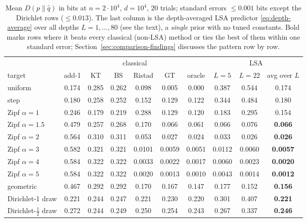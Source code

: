 \documentclass[11pt]{article}
\newcommand{\KL}{D}
\begin{document}
\begin{table}[t]
  \centering
  \small
  \setlength{\tabcolsep}{4.5pt}
  \begin{tabular}{lcccccc|ccc}
    \toprule
    & \multicolumn{6}{c|}{classical} & \multicolumn{3}{c}{LSA}\\
    target & add-1 & KT & BS & Ristad & GT & oracle & \(L{=}5\) & \(L{=}22\) & avg over \(L\)\\
    \midrule
    uniform            & 0.174 & 0.285 & 0.262 & 0.098 & 0.005 & 0.000 & 0.387 & 0.544 & 0.174\\
    step               & 0.180 & 0.258 & 0.252 & 0.152 & 0.129 & 0.122 & 0.344 & 0.484 & 0.180\\
    Zipf \(\alpha=1\)  & 0.246 & 0.179 & 0.219 & 0.288 & 0.129 & 0.120 & 0.183 & 0.295 & 0.154\\
    Zipf \(\alpha=1.5\)& 0.479 & 0.257 & 0.268 & 0.170 & 0.066 & 0.061 & 0.066 & 0.076 & \textbf{0.066}\\
    Zipf \(\alpha=2\)  & 0.564 & 0.310 & 0.311 & 0.053 & 0.027 & 0.024 & 0.033 & 0.026 & \textbf{0.026}\\
    Zipf \(\alpha=3\)  & 0.582 & 0.321 & 0.321 & 0.0101 & 0.0059 & 0.0051 & 0.0112 & 0.0060 & \textbf{0.0057}\\
    Zipf \(\alpha=4\)  & 0.584 & 0.322 & 0.322 & 0.0033 & 0.0022 & 0.0017 & 0.0060 & 0.0023 & \textbf{0.0020}\\
    Zipf \(\alpha=5\)  & 0.584 & 0.322 & 0.322 & 0.0020 & 0.0013 & 0.0010 & 0.0043 & 0.0014 & \textbf{0.0012}\\
    geometric          & 0.467 & 0.292 & 0.292 & 0.170 & 0.167 & 0.147 & 0.177 & 0.152 & \textbf{0.156}\\
    Dirichlet-1 draw   & 0.221 & 0.244 & 0.247 & 0.221 & 0.230 & 0.220 & 0.301 & 0.407 & \textbf{0.221}\\
    Dirichlet-\(\tfrac12\) draw & 0.272 & 0.244 & 0.249 & 0.250 & 0.254 & 0.243 & 0.267 & 0.337 & \textbf{0.246}\\
    \bottomrule
  \end{tabular}
  \caption{Mean \(\KL(p\|\hat q)\) in bits at \(n=2\cdot10^4\), \(d=10^4\),
  \(20\) trials; standard errors \(\le0.001\) bits except the Dirichlet
  rows (\(\le0.013\)).  The last column is the depth-averaged LSA predictor
  \eqref{eq:depth-average} over all depths \(L=1,\dots,80\) (see the text), a \emph{single} prior
  with no tuned constants.
Bold marks rows where it beats every classical (non-LSA) method or ties
the best of them within one standard error;
Section~\ref{sec:comparison-findings} discusses the pattern row by row.
  }
  \label{tab:orlitsky}
\end{table}
\end{document}
